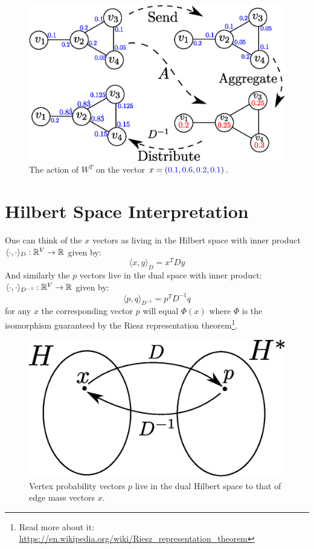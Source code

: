 \documentclass[11pt]{article}
\begin{document}
\begin{figure}[h]
    \centering
    \includegraphics[scale=0.65]{WT.eps}
    \caption{The action of $W^T$ on the vector $x = ({\color{blue}0.1},{\color{blue}0.6},{\color{blue}0.2},{\color{blue}0.1})$.}
    \label{fig:Wt}
\end{figure}

\section{Hilbert Space Interpretation}
One can think of the $x$ vectors as living in the Hilbert space with inner product $\langle\cdot ,\cdot\rangle_D: \mathbb{R}^V \to \mathbb{R}$ given by:
\[
    \langle x,y \rangle_D = x^TDy
\]
And similarly the $p$ vectors live in the dual space with inner product: $\langle \cdot,\cdot\rangle_{D^{-1}}: \mathbb{R}^V \to \mathbb{R}$ given by:
\[
    \langle p,q \rangle_{D^{-1}} = p^TD^{-1}q
\]
for any $x$ the corresponding vector $p$ will equal $\Phi(x)$ where $\Phi$ is the isomorphism guaranteed by the Riesz representation theorem\footnote{Read more about it: \url{https://en.wikipedia.org/wiki/Riesz_representation_theorem}}.

\begin{figure}[h]
    \centering
    \includegraphics[scale=.75]{HSpaceSGT.eps}
    \caption{Vertex probability vectors $p$ live in the dual Hilbert space to that of edge mass vectors $x$.}
    \label{fig:my_label}
\end{figure}
\end{document}
